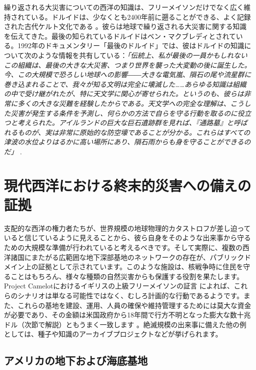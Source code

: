 \documentclass[10pt,twocolumn,letterpaper]{article}
\begin{document}
繰り返される大災害についての西洋の知識は、フリーメイソンだけでなく広く維持されている。ドルイドは、少なくとも2400年前に遡ることができる、よく記録された古代ケルト文化である \cite{7}。彼らは地球で繰り返される大災害に関する知識を伝えてきた。最後の知られているドルイドはベン・マクブレディとされている。1992年のドキュメンタリー「最後のドルイド」では、彼はドルイドの知識について次のような情報を共有している：\textit{「伝統上、私が最後の一員かもしれないこの組織は、最後の大きな大災害、つまり世界を襲った大変動の後に誕生した。今、この大規模で恐ろしい地球への影響――大きな電気嵐、隕石の尾や流星群に巻き込まれることで、我々が知る文明は完全に壊滅した……あらゆる知識は組織の中で受け継がれたが、特に天文学に関心が寄せられた。というのも、彼らは非常に多くの大きな災難を経験したからである。天文学への完全な理解は、こうした災害が発生する条件を予測し、何らかの方法で自らを守る行動を取るのに役立つと考えられた。アイルランドの巨大な巨石遺跡群を見れば、『通路墓』と呼ばれるものが、実は非常に原始的な防空壕であることが分かる。これらはすべての津波の水位よりはるかに高い場所にあり、隕石雨からも身を守ることができるのだ」} \cite{8,9}.

\section{現代西洋における終末的災害への備えの証拠}

支配的な西洋の権力者たちが、世界規模の地球物理的カタストロフが差し迫っていると信じているように見えることから、彼ら自身をそのような出来事から守るための大規模な準備が行われていると考えるべきです。そして実際に、複数の西洋諸国にまたがる広範囲な地下深部基地のネットワークの存在が、パブリックドメイン上の証拠として示されています。このような施設は、核戦争時に住民を守ることはもちろん、様々な種類の自然災害からも保護する役割を果たします。Project Camelotにおけるイギリスの上級フリーメイソンの証言 \cite{4,6} によれば、これらのシナリオは単なる可能性ではなく、むしろ計画的な行動であるようです。また、これらの基地を建設、運用、人員の確保や維持管理するためには莫大な資金が必要であり、その金額は米国政府から18年間で行方不明となった膨大な数十兆ドル（次節で解説）ともうまく一致します \cite{11,12,13}。絶滅規模の出来事に備えた他の例としては、種子や知識のアーカイブプロジェクトなどが挙げられます。

\subsection{アメリカの地下および海底基地}
\end{document}
